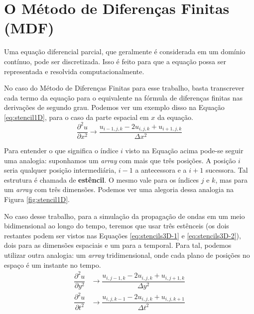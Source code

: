 \section{O Método de Diferenças Finitas (MDF)}

	Uma equação diferencial parcial, que geralmente é considerada em um domínio 
	contínuo, pode ser discretizada. Isso é feito para que a equação possa ser 
	representada e resolvida computacionalmente. 
	
	No caso do Método de Diferenças	Finitas para esse trabalho, basta 
	transcrever cada termo da equação para o equivalente na fórmula de 
	diferenças finitas nas derivações de segundo grau. Podemos 
	ver um exemplo disso na Equação \ref{eq:stencil1D}, para o caso da parte 
	espacial em $x$ da equação. 
	\begin{equation}
	    \dfrac{\partial^2 u}{\partial x^2} \xrightarrow{} \dfrac{u_{i-1,j,k} - 
	    2u_{i,j,k} + u_{i+1,j,k}}{\Delta x^2}
	    \label{eq:stencil1D}
	\end{equation}
	
	Para entender o que 
	significa o índice $i$ visto na Equação acima pode-se seguir uma analogia: 
	suponhamos um \textit{array} com mais que três posições. A posição $i$ seria 
	qualquer posição intermediária, $i-1$ a antecessora e a $i+1$ sucessora. Tal 
	estrutura é chamada de \textbf{estêncil}. O mesmo vale para os índices
	$j$ e $k$, mas para um \textit{array} com três dimensões. Podemos ver 
	uma alegoria dessa analogia na Figura \ref{fig:stencil1D}.
	
	No caso desse trabalho, para a simulação da propagação de ondas em um 
	meio bidimensional ao longo do tempo, teremos que usar três estênceis 
	(os dois restantes podem ser vistos nas Equações 
	\ref{eq:stencils3D-1} e \ref{eq:stencils3D-2}), dois para as dimensões 
	espaciais e um para a temporal. Para tal, 
	podemos utilizar outra analogia: um \textit{array} tridimensional, onde cada
	plano de posições no espaço é um instante no tempo.
	\begin{align}
	    \dfrac{\partial^2 u}{\partial y^2} &\xrightarrow{} \dfrac{u_{i,j-1,k} - 2u_{i,j,k} + 
	        u_{i,j+1,k}}{\Delta y^2} 
	    \label{eq:stencils3D-1}
	    \\
		\dfrac{\partial^2 u}{\partial t^2} &\xrightarrow{} \dfrac{u_{i,j,k-1} - 2u_{i,j,k} + 
			u_{i,j,k+1}}{\Delta t^2}
	    \label{eq:stencils3D-2}
	\end{align}
	
